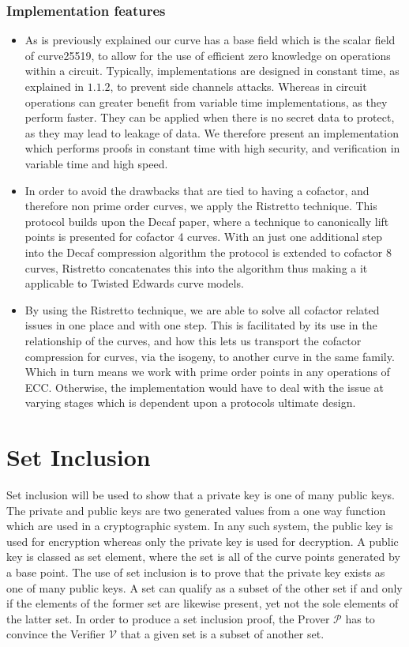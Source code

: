 \documentclass{article}
\begin{document}
\subsubsection{Implementation features}
\begin{itemize}
    \item As is previously explained our curve has a base field which is the scalar field of curve25519, to allow for the use of efficient zero knowledge on operations within a circuit. Typically, implementations are designed in constant time, as explained in $1.1.2$, to prevent side channels attacks. Whereas in circuit operations can greater benefit from variable time implementations, as they perform faster. They can be applied when there is no secret data to protect, as they may lead to leakage of data. We therefore present an implementation which performs proofs in constant time with high security, and  verification in variable time and high speed. \\ 
    \item In order to avoid the drawbacks that are tied to having a cofactor, and therefore non prime order curves, we apply the Ristretto technique. This protocol builds upon the Decaf paper, where a technique to canonically lift points is presented for cofactor 4 curves. With an just one additional step into the Decaf compression algorithm the protocol is extended to cofactor 8 curves, Ristretto concatenates this into the algorithm thus making a it applicable to Twisted Edwards curve models.\\
    \item By using the Ristretto technique, we are able to solve all cofactor related issues in one place and with one step. This is facilitated by its use in the relationship of the curves, and how this lets us transport the cofactor compression for curves, via the isogeny, to another curve in the same family. Which in turn means we work with prime order points in any operations of ECC. Otherwise, the implementation would have to deal with the issue at varying stages which is dependent upon a protocols ultimate design. \\
\end{itemize}
 
\section{Set Inclusion}
Set inclusion will be used to show that a private key is one of many public keys. The private and public keys are two generated values from a one way function which are used in a cryptographic system. In any such system, the public key is used for encryption whereas only the private key is used for decryption. A public key is classed as set element, where the set is all of the curve points generated by a base point. The use of set inclusion is to prove that the private key exists as one of many public keys. A set can qualify as a subset of the other set if and only if the elements of the former set are likewise present, yet not the sole elements of the latter set. In order to produce a set inclusion proof, the Prover $\mathcal{P}$ has to convince the Verifier $\mathcal{V}$ that a given set is a subset of another set.
\end{document}
